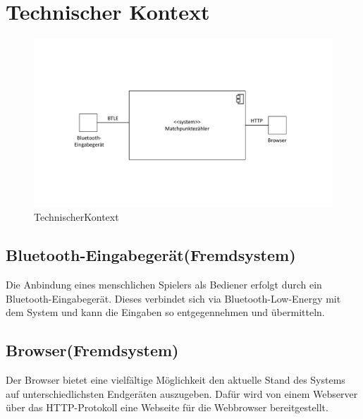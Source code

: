 \section{Technischer Kontext}
\begin{figure}[H]
\begin{center}
\includegraphics[scale=0.5]{Grafiken/TechnischerKontext.pdf}
\caption{TechnischerKontext}
\end{center}
\end{figure}

\subsection*{Bluetooth-Eingabegerät(Fremdsystem)}
Die Anbindung eines menschlichen Spielers als Bediener erfolgt durch ein Bluetooth-Eingabegerät. Dieses verbindet sich via Bluetooth-Low-Energy mit dem System und kann die Eingaben so entgegennehmen und übermitteln.
\subsection*{Browser(Fremdsystem)}
Der Browser bietet eine vielfältige Möglichkeit den aktuelle Stand des Systems auf unterschiedlichsten Endgeräten auszugeben. Dafür wird von einem Webserver über das HTTP-Protokoll eine Webseite für die Webbrowser bereitgestellt.
